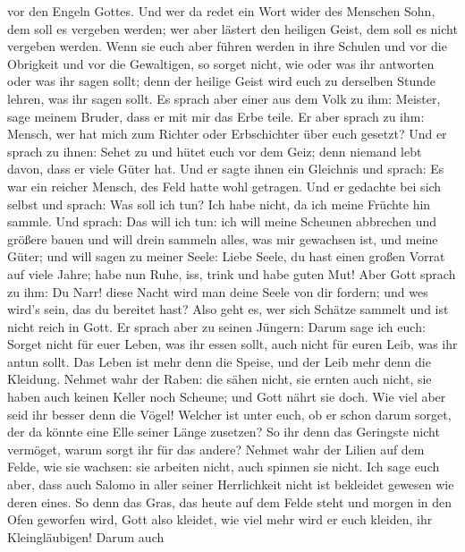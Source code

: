 vor den Engeln Gottes.  Und wer da redet ein Wort wider des
Menschen Sohn, dem soll es vergeben werden; wer aber lästert den
heiligen Geist, dem soll es nicht vergeben werden.  Wenn
sie euch aber führen werden in ihre Schulen und vor die Obrigkeit und
vor die Gewaltigen, so sorget nicht, wie oder was ihr antworten oder was
ihr sagen sollt;  denn der heilige Geist wird euch zu
derselben Stunde lehren, was ihr sagen sollt.  Es sprach
aber einer aus dem Volk zu ihm: Meister, sage meinem Bruder, dass er mit
mir das Erbe teile.  Er aber sprach zu ihm: Mensch, wer hat
mich zum Richter oder Erbschichter über euch gesetzt?  Und
er sprach zu ihnen: Sehet zu und hütet euch vor dem Geiz; denn niemand
lebt davon, dass er viele Güter hat.  Und er sagte ihnen
ein Gleichnis und sprach: Es war ein reicher Mensch, des Feld hatte wohl
getragen.  Und er gedachte bei sich selbst und sprach: Was
soll ich tun? Ich habe nicht, da ich meine Früchte hin sammle.
 Und sprach: Das will ich tun: ich will meine Scheunen
abbrechen und größere bauen und will drein sammeln alles, was mir
gewachsen ist, und meine Güter;  und will sagen zu meiner
Seele: Liebe Seele, du hast einen großen Vorrat auf viele Jahre; habe
nun Ruhe, iss, trink und habe guten Mut!  Aber Gott sprach
zu ihm: Du Narr! diese Nacht wird man deine Seele von dir fordern; und
wes wird's sein, das du bereitet hast?  Also geht es, wer
sich Schätze sammelt und ist nicht reich in Gott.  Er
sprach aber zu seinen Jüngern: Darum sage ich euch: Sorget nicht für
euer Leben, was ihr essen sollt, auch nicht für euren Leib, was ihr
antun sollt.  Das Leben ist mehr denn die Speise, und der
Leib mehr denn die Kleidung.  Nehmet wahr der Raben: die
sähen nicht, sie ernten auch nicht, sie haben auch keinen Keller noch
Scheune; und Gott nährt sie doch. Wie viel aber seid ihr besser denn die
Vögel!  Welcher ist unter euch, ob er schon darum sorget,
der da könnte eine Elle seiner Länge zusetzen?  So ihr denn
das Geringste nicht vermöget, warum sorgt ihr für das andere?
 Nehmet wahr der Lilien auf dem Felde, wie sie wachsen: sie
arbeiten nicht, auch spinnen sie nicht. Ich sage euch aber, dass auch
Salomo in aller seiner Herrlichkeit nicht ist bekleidet gewesen wie
deren eines.  So denn das Gras, das heute auf dem Felde
steht und morgen in den Ofen geworfen wird, Gott also kleidet, wie viel
mehr wird er euch kleiden, ihr Kleingläubigen!  Darum auch
